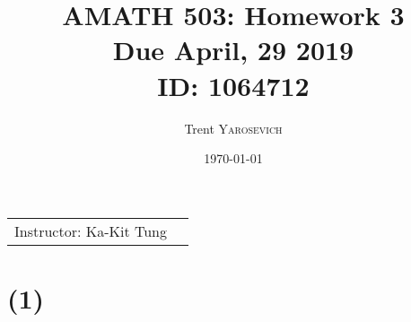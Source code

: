 \documentclass{article}
\title{AMATH 503: Homework 3 \\Due April, 29 2019 \\ ID: 1064712} %
\author{Trent \textsc{Yarosevich}} %
\date{\today} %
\begin{document}
\maketitle %
\setlength\parindent{1cm}

\begin{center}
\begin{tabular}{l r}
Instructor: Ka-Kit Tung %
\end{tabular}
\end{center}
\doublespacing

\section*{\textbf{(1)}}
\end{document}
